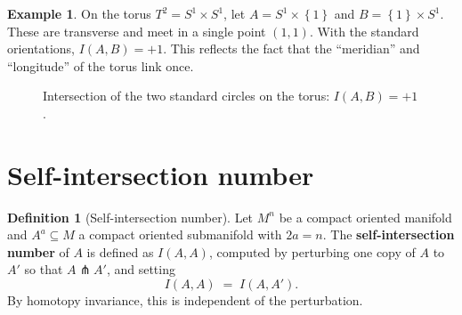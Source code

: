 \documentclass[12pt,a4paper,openany]{book}
\theoremstyle{definition}
\newtheorem{definition}[theorem]{Definition}
\newtheorem{example}[theorem]{Example}
\theoremstyle{remark}
\newcommand{\set}[1]{\left\{ #1 \right\}}
\begin{document}
\begin{example}\label{ex:intersection-torus}
On the torus $T^2 = S^1 \times S^1$, let $A = S^1 \times \set{1}$ and
$B = \set{1} \times S^1$. These are transverse and meet in a single point
$(1,1)$. With the standard orientations, $I(A, B) = +1$. This reflects
the fact that the ``meridian'' and ``longitude'' of the torus link once.
\end{example}

\begin{figure}[ht]
\centering
{}
\caption{Intersection of the two standard circles on the torus: $I(A,B)=+1$.}
\label{fig:intersection-torus}
\end{figure}

\section{Self-intersection number}\label{sec:self-intersection}

\begin{definition}[Self-intersection number]\label{def:self-intersection}
Let $M^n$ be a compact oriented manifold and $A^a \subseteq M$ a compact
oriented submanifold with $2a = n$. The \textbf{self-intersection number}
of $A$ is defined as $I(A, A)$, computed by perturbing one copy of $A$ to
$A'$ so that $A \pitchfork A'$, and setting
\[
  I(A, A) \;=\; I(A, A').
\]
By homotopy invariance, this is independent of the perturbation.
\end{definition}
\end{document}
